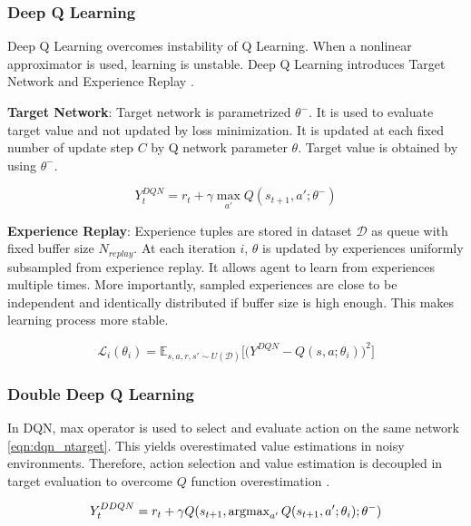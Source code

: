 \subsubsection{Deep Q Learning}

Deep Q Learning overcomes instability of Q Learning. When a nonlinear approximator is used, learning is unstable. Deep Q Learning introduces Target Network and Experience Replay \cite{mnih_human-level_2015}.

\textbf{Target Network}: Target network is parametrized $\theta^-$. It is used to evaluate target value and not updated by loss minimization. It is updated at each fixed number of update step $C$ by Q network parameter $\theta$. Target value is obtained by using $\theta^-$.

\begin{equation}
\label{eqn:dqn_ntarget}
Y_t^{DQN} = r_t + \gamma \max_{a'} Q(s_{t+1},a';\theta^-)
\end{equation}

\textbf{Experience Replay}: Experience tuples are stored in dataset $\mathcal{D}$ as queue with fixed buffer size $N_{replay}$. At each iteration $i$, $\theta$ is updated by experiences uniformly subsampled from experience replay. It allows agent to learn from experiences multiple times. More importantly, sampled experiences are close to be independent and identically distributed if buffer size is high enough. This makes learning process more stable.  

\begin{equation}
\label{eqn:dqn_loss}
\mathcal{L}_i(\theta_i) = \mathbb{E}_{s,a,r,s'\sim U(\mathcal{D})}\Big[\big( Y^{DQN} - Q(s,a;\theta_i) \big) ^ 2 \Big]
\end{equation}

\subsubsection{Double Deep Q Learning}

In DQN, max operator is used to select and evaluate action on the same network \ref{eqn:dqn_ntarget}. This yields overestimated value estimations in noisy environments. Therefore, action selection and value estimation is decoupled in target evaluation to overcome $Q$ function overestimation \cite{van_hasselt_deep_2015}.

\begin{equation}
\label{eqn:ddqn_ntarget}
Y_t^{DDQN} = r_t + \gamma Q(s_{t+1}, \operatorname{\textup{argmax}}_{a'} Q(s_{t+1}, a'; \theta_i );\theta^-)
\end{equation}

